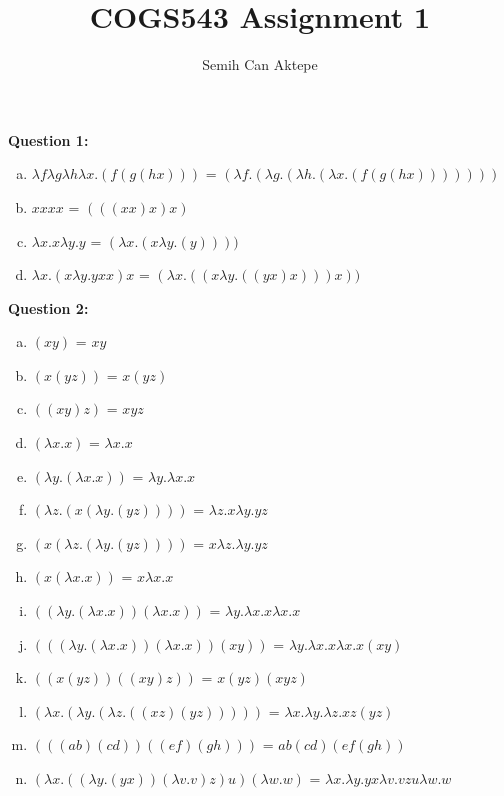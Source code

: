 \documentclass[11pt,a4paper]{article}
\author{Semih Can Aktepe}
\title{COGS543 Assignment 1}
\begin{document}
\thispagestyle{empty}
\maketitle
\justify
\textbf{Question 1:}
\begin{enumerate}[(a)]
\item $\lambda f \lambda g \lambda h \lambda x.(f(g(h x)))$ = $(\lambda f.( \lambda g.( \lambda h.( \lambda x.(f(g(h x)))))))$
\item $xxxx$ = $(((xx)x)x)$
\item $\lambda x.x\lambda y.y$ = $(\lambda x.(x\lambda y.(y))))$
\item $\lambda x.(x\lambda y.yxx)x$ = $(\lambda x.((x\lambda y.((yx)x)))x))$
\end{enumerate}

\noindent \textbf{Question 2:}
\begin{enumerate}[(a)]
\item $(xy)$ = $xy$
\item $(x(yz))$ = $x(yz)$
\item $((xy)z)$ = $xyz$
\item $(\lambda x.x)$ = $\lambda x.x$
\item $(\lambda y.(\lambda x.x))$ = $\lambda y.\lambda x.x$
\item $(\lambda z.(x(\lambda y.(yz))))$ = $\lambda z.x\lambda y.yz$
\item $(x(\lambda z.(\lambda y.(yz))))$ = $x\lambda z.\lambda y.yz$
\item $(x(\lambda x.x))$ = $x\lambda x.x$
\item $((\lambda y.(\lambda x.x))(\lambda x.x))$ = $\lambda y.\lambda x.x\lambda x.x$
\item $(((\lambda y.(\lambda x.x))(\lambda x.x))(xy))$ = $\lambda y.\lambda x.x\lambda x.x(xy)$
\item $((x(yz))((xy)z))$ = $x(yz)(xyz)$
\item $(\lambda x.(\lambda y.(\lambda z.((xz)(yz)))))$ = $\lambda x.\lambda y.\lambda z.xz(yz)$
\item $(((ab)(cd))((ef)(gh)))$ = $ab(cd)(ef(gh))$
\item $(\lambda x.((\lambda y.(yx))(\lambda v.v)z)u)(\lambda w.w)$ = $\lambda x.\lambda y.yx\lambda v.vzu\lambda w.w$
\end{enumerate}

\clearpage
\end{document}

